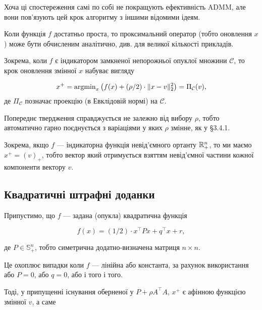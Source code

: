 Хоча ці спостереження самі по собі не покращують ефективність ADMM, але вони по\-в'яз\-у\-ють цей крок алгоритму з іншими відомими ідеям. \medskip

Коли функція $f$ достатньо проста, то проксимальний оператор (тобто оновлення $x$) може бути обчисленим аналітично, див. \cite{41} для великої кількості прикладів.

\begin{example}
	Зокрема, коли $f$ є індикатором замкненої непорожньої опуклої множини $\mathcal{C}$, то крок оновлення змінної $x$ набуває вигляду
	
	\begin{equation}
		x^+ = \operatorname{argmin}_x \left(f(x) + (\rho / 2) \cdot \|x - v\|_2^2\right) = \Pi_\mathcal{C}(v),
	\end{equation}
	де $\Pi_\mathcal{C}$ позначає проекцію (в Евклідовій нормі) на $\mathcal{C}$.
\end{example}

\begin{remark}
	Попереднє твердження справджується не залежно від вибору $\rho$, тобто автоматично гарно поєднується з варіаціями у яких $\rho$ змінне, як у \S3.4.1.
\end{remark}

\begin{example}
	Зокрема, якщо $f$ --- індикаторна функція невід'ємного ортанту $\mathbb{R}_+^n$, то ми маємо $x^+ = (v)_+$, тобто вектор який отримується взяттям невід'ємної частини кожної компоненти вектору $v$.
\end{example}

\subsection{Квадратичні штрафні доданки}

Припустимо, що $f$ --- задана (опукла) квадратична функція

\begin{equation}
	f(x) = (1 / 2) \cdot x^\intercal P x + q^\intercal x + r,
\end{equation}

де $P \in \mathbb{S}_+^n$, тобто симетрична додатно-визначена матриця $n \times n$.

\begin{remark}
	Це охоплює випадки коли $f$ --- лінійна або константа, за рахунок використання або $P = 0$, або $q = 0$, або і того і того.
\end{remark}

Тоді, у припущенні існування оберненої у $P + \rho A^\intercal A$, $x^+$ є афінною функцією змінної $v$, а саме

